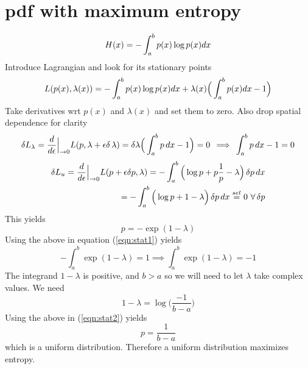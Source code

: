 \documentclass{article}
\newcommand{\beq}{\begin{equation}}
\newcommand{\eeq}{\end{equation}}
\newcommand{\ber}{\begin{eqnarray}}
\newcommand{\eer}{\end{eqnarray}}
\newcommand{\ddeps}{\frac{d}{d\epsilon}\Big{|}_{\rightarrow{0}}}
\begin{document}
\section{pdf with maximum entropy}
\beq
H(x) = -\int_{a}^{b}p(x)\log{p(x)}dx \\
\eeq
Introduce Lagrangian and look for its stationary points
\beq
L(p(x),\lambda(x)) = -\int_{a}^{b}p(x)\log{p(x)}dx  + \lambda(x)\Big(\int_{a}^{b}p(x)dx - 1 \Big)\\
\eeq
Take derivatives wrt $p(x)$ and $\lambda(x)$ and set them to zero. Also drop spatial dependence for clarity
\beq
\label{eqn:stat1}
\delta{}L_{\lambda} = \ddeps L(p,\lambda+\epsilon\delta\,\lambda)=\delta\lambda\Big(\int_a^b {p\,}dx-1\Big) = 0 \, \implies \,\int_a^b {p\,}dx-1=0
\eeq
%
% 
\ber
\delta{}L_u = \ddeps L(p+\epsilon\delta{p},\lambda) = -\int_a^b\Big(\log{p} + p\frac{1}{p} -\lambda\Big)\,\delta{p}\,dx \\
= -\int_a^b\Big(\log{p} + 1 -\lambda\Big)\,\delta{p}\,dx \stackrel{set}{=} 0 \,\,\forall\,\delta{p}
\eer
This yields
%
%
\beq
\label{eqn:stat2}
p = -\exp(1-\lambda)
\eeq
%
%
Using the above in equation (\ref{eqn:stat1}) yields
\beq
-\int_a^b\exp(1-\lambda)=1 \implies \int_a^b\exp(1-\lambda)=-1
\eeq
The integrand $1-\lambda$ is positive, and $b>a$ so we will need to let $\lambda$ take complex values. We need
%
%
\beq
1-\lambda = \log\Big(\frac{-1}{b-a}\Big)
\eeq
Using the above in (\ref{eqn:stat2}) yields
\beq
p = \frac{1}{b-a}
\eeq
which is a uniform distribution. Therefore a uniform distribution maximizes entropy.
%
%
%
\end{document}
